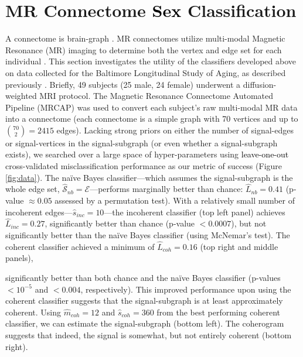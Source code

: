 \documentclass[10pt,journal,cspaper,compsoc]{IEEEtran}
\providecommand{\tk}[1]{\textcolor{black}{#1}}
\providecommand{\mc}[1]{\mathcal{#1}}
\providecommand{\wh}[1]{\widehat{#1}}
\providecommand{\mhc}[1]{\widehat{\mathcal{#1}}}
\newcommand{\comment}[1]{}
\begin{document}

\section{MR Connectome \tk{Sex} Classification} %
\label{sub:sex}

A connectome is brain-graph \cite{Sporns2010}.  MR connectomes utilize multi-modal Magnetic Resonance (MR) imaging to determine both the vertex and edge set for each individual \cite{Hagmann2010}.  This section investigates the utility of the classifiers developed above on data collected for the Baltimore Longitudinal Study of Aging, as described previously \cite{OHBM10}.  Briefly, 49 subjects (25 male, 24 female) underwent a diffusion-weighted MRI protocol. The Magnetic Resonance Connectome Automated Pipeline (MRCAP) was used to convert each subject's raw multi-modal MR data into a connectome \cite{MRCAP11} (each connectome is a simple graph with 70 vertices and up to $\binom{70}{2}=2415$ edges). Lacking strong priors on either the number of signal-edges or signal-vertices in the signal-subgraph (or even whether a signal-subgraph exists), we searched over a large space of hyper-parameters using \tk{leave-one-out} cross-validated misclassification performance as our metric of success (Figure \ref{fig:data}).  The na\"ive Bayes classifier---which assumes the signal-subgraph is the whole edge set, $\mhc{S}_{nb}=\mc{E}$---performs marginally better than chance: $\wh{L}_{nb}=0.41$ (p-value $\approx 0.05$ assessed by a permutation test).  With a relatively small number of incoherent edges---$\wh{s}_{inc}=10$---the incoherent classifier (top left panel) achieves $\wh{L}_{inc}=0.27$, significantly better than chance (p-value $<0.0007$), but not significantly better than the na\"ive Bayes classifier (using McNemar's test).  The coherent classifier achieved a minimum of $\wh{L}_{coh}=0.16$ (top right and middle panels), 
\comment{not significantly better than the incoherent classifier, but }
significantly better than both chance and the na\"ive Bayes classifier (p-values $<10^{-5}$ and $<0.004$, respectively).  This improved performance upon using the coherent classifier suggests that the signal-subgraph is at least approximately coherent. Using $\wh{m}_{coh}=12$ and $\wh{s}_{coh}=360$ from the best performing coherent classifier, we can estimate the signal-subgraph (bottom left).  The coherogram suggests that indeed, the signal is somewhat, but not entirely coherent (bottom right).
\end{document}
